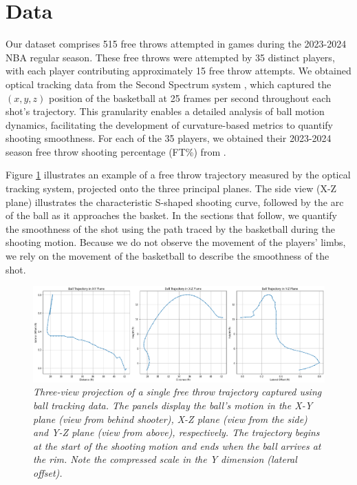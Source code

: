 \documentclass{article}
\begin{document}
  \section{Data}

    Our dataset comprises 515 free throws attempted in games during the 2023-2024 NBA regular season. These free throws were attempted by 35 distinct players, with each player contributing approximately 15 free throw attempts. We obtained optical tracking data from the Second Spectrum system \citep{national_basketball_association_nba_2016}, which captured the $(x, y, z)$ position of the basketball at 25 frames per second throughout each shot's trajectory. This granularity enables a detailed analysis of ball motion dynamics, facilitating the development of curvature-based metrics to quantify shooting smoothness. For each of the 35 players, we obtained their 2023-2024 season free throw shooting percentage (FT\%) from \citet{basketball_reference_2023-24_2024}.

    Figure \ref{fig:data-description} illustrates an example of a free throw trajectory measured by the optical tracking system, projected onto the three principal planes. The side view (X-Z plane) illustrates the characteristic S-shaped shooting curve, followed by the arc of the ball as it approaches the basket. In the sections that follow, we quantify the smoothness of the shot using the path traced by the basketball during the shooting motion. Because we do not observe the movement of the players' limbs, we rely on the movement of the basketball to describe the smoothness of the shot.

    \begin{figure}[H]
        \centering
        \includegraphics[scale=0.3]{articles/figures/data_description.png}
        \caption{\it Three-view projection of a single free throw trajectory captured using ball tracking data. The panels display the ball's motion in the X-Y plane (view from behind shooter), X-Z plane (view from the side) and Y-Z plane (view from above), respectively. The trajectory begins at the start of the shooting motion and ends when the ball arrives at the rim. Note the compressed scale in the Y dimension (lateral offset).}
        \label{fig:data-description}
      \end{figure}
      
\end{document}
